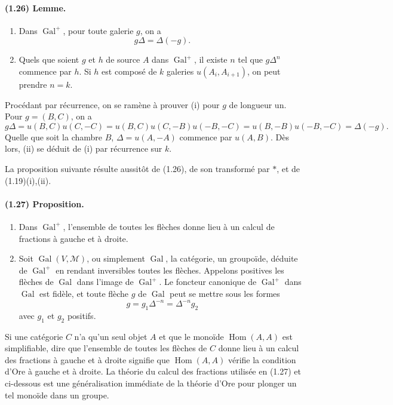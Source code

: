 \documentclass[10pt]{article}
\begin{document}
\paragraph{(1.26) Lemme.}
\begin{enumerate}[label=(\roman*)]
\item Dans \(\operatorname{Gal}^+\), pour toute galerie \(g\), on a
\[
g\Delta=\Delta(-g).
\]
\item Quels que soient \(g\) et \(h\) de source \(A\) dans \(\operatorname{Gal}^+\), il existe \(n\) tel que \(g\Delta^n\) commence par \(h\). Si \(h\) est composé de \(k\) galeries \(u(A_i,A_{i+1})\), on peut prendre \(n=k\).
\end{enumerate}

Procédant par récurrence, on se ramène à prouver (i) pour \(g\) de longueur un. Pour \(g=(B,C)\), on a
\[
g\Delta=u(B,C)u(C,-C)=u(B,C)u(C,-B)u(-B,-C)
=u(B,-B)u(-B,-C)=\Delta(-g).
\]
Quelle que soit la chambre \(B\), \(\Delta=u(A,-A)\) commence par \(u(A,B)\). Dès lors, (ii) se déduit de (i) par récurrence sur \(k\).

La proposition suivante résulte aussitôt de (1.26), de son transformé par \(*\), et de (1.19)(i),(ii).

\paragraph{(1.27) Proposition.}
\begin{enumerate}[label=(\roman*)]
\item Dans \(\operatorname{Gal}^+\), l'ensemble de toutes les flèches donne lieu à un calcul de fractions à gauche et à droite.
\item Soit \(\operatorname{Gal}(V,\mathcal M)\), ou simplement \(\operatorname{Gal}\), la catégorie, un groupoïde, déduite de \(\operatorname{Gal}^+\) en rendant inversibles toutes les flèches. Appelons positives les flèches de \(\operatorname{Gal}\) dans l'image de \(\operatorname{Gal}^+\). Le foncteur canonique de \(\operatorname{Gal}^+\) dans \(\operatorname{Gal}\) est fidèle, et toute flèche \(g\) de \(\operatorname{Gal}\) peut se mettre sous les formes
\[
g=g_1\Delta^{-n}=\Delta^{-n}g_2
\]
avec \(g_1\) et \(g_2\) positifs.
\end{enumerate}
Si une catégorie \(C\) n'a qu'un seul objet \(A\) et que le monoïde \(\operatorname{Hom}(A,A)\) est simplifiable, dire que l'ensemble de toutes les flèches de \(C\) donne lieu à un calcul des fractions à gauche et à droite signifie que \(\operatorname{Hom}(A,A)\) vérifie la condition d'Ore à gauche et à droite. La théorie du calcul des fractions utilisée en (1.27) et ci-dessous est une généralisation immédiate de la théorie d'Ore pour plonger un tel monoïde dans un groupe.
\end{document}
